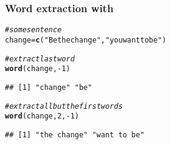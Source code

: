 \documentclass[12pt]{beamer}\usepackage[]{graphicx}\usepackage[]{color}
\makeatletter
\newcommand{\hlnum}[1]{\textcolor[rgb]{0.686,0.059,0.569}{#1}}%
\newcommand{\hlstr}[1]{\textcolor[rgb]{0.192,0.494,0.8}{#1}}%
\newcommand{\hlcom}[1]{\textcolor[rgb]{0.678,0.584,0.686}{\textit{#1}}}%
\newcommand{\hlopt}[1]{\textcolor[rgb]{0,0,0}{#1}}%
\newcommand{\hlstd}[1]{\textcolor[rgb]{0.345,0.345,0.345}{#1}}%
\newcommand{\hlkwb}[1]{\textcolor[rgb]{0.69,0.353,0.396}{#1}}%
\newcommand{\hlkwd}[1]{\textcolor[rgb]{0.737,0.353,0.396}{\textbf{#1}}}%
\newenvironment{kframe}{%
 \def\at@end@of@kframe{}%
 \ifinner\ifhmode%
  \def\at@end@of@kframe{\end{minipage}}%
  \begin{minipage}{\columnwidth}%
 \fi\fi%
 \def\FrameCommand##1{\hskip\@totalleftmargin \hskip-\fboxsep
 \colorbox{shadecolor}{##1}\hskip-\fboxsep
     \hskip-\linewidth \hskip-\@totalleftmargin \hskip\columnwidth}%
 \MakeFramed {\advance\hsize-\width
   \@totalleftmargin\z@ \linewidth\hsize
   \@setminipage}}%
 {\par\unskip\endMakeFramed%
 \at@end@of@kframe}
\newenvironment{knitrout}{}{} %
\makeatother
\begin{document}
\begin{frame}[fragile]
\frametitle{Word extraction with }

\begin{knitrout}\footnotesize
{}\color{fgcolor}\begin{kframe}
\begin{alltt}
\hlcom{# some sentence}
\hlstd{change} \hlkwb{=} \hlkwd{c}\hlstd{(}\hlstr{"Be the change"}\hlstd{,} \hlstr{"you want to be"}\hlstd{)}

\hlcom{# extract last word}
\hlkwd{word}\hlstd{(change,} \hlopt{-}\hlnum{1}\hlstd{)}
\end{alltt}
\begin{verbatim}
## [1] "change" "be"
\end{verbatim}
\begin{alltt}
\hlcom{# extract all but the first words}
\hlkwd{word}\hlstd{(change,} \hlnum{2}\hlstd{,} \hlopt{-}\hlnum{1}\hlstd{)}
\end{alltt}
\begin{verbatim}
## [1] "the change" "want to be"
\end{verbatim}
\end{kframe}
\end{knitrout}

\end{frame}

\end{document}
